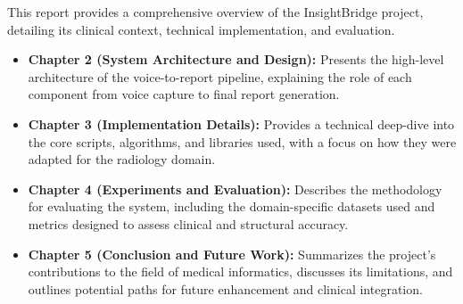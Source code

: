This report provides a comprehensive overview of the InsightBridge project, detailing its clinical context, technical implementation, and evaluation.
\begin{itemize}
    \item \textbf{Chapter 2 (System Architecture and Design):} Presents the high-level architecture of the voice-to-report pipeline, explaining the role of each component from voice capture to final report generation.
    \item \textbf{Chapter 3 (Implementation Details):} Provides a technical deep-dive into the core scripts, algorithms, and libraries used, with a focus on how they were adapted for the radiology domain.
    \item \textbf{Chapter 4 (Experiments and Evaluation):} Describes the methodology for evaluating the system, including the domain-specific datasets used and metrics designed to assess clinical and structural accuracy.
    \item \textbf{Chapter 5 (Conclusion and Future Work):} Summarizes the project's contributions to the field of medical informatics, discusses its limitations, and outlines potential paths for future enhancement and clinical integration.
\end{itemize}